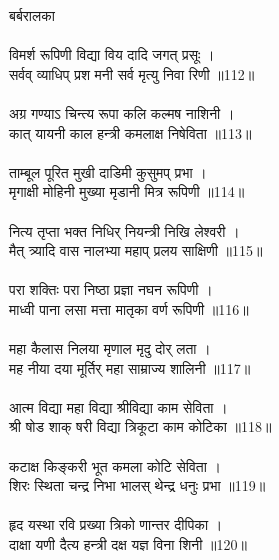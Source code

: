 {\small{} बर्बरालका}\\
\\
विमर्श रूपिणी विद्या विय दादि जगत् प्रसूः ।\\
सर्वव् व्याधिप् प्रश मनी सर्व मृत्यु निवा रिणी ॥112॥\\
\\
अग्र गण्याऽ चिन्त्य रूपा कलि कल्मष नाशिनी ।\\
कात् यायनी काल हन्त्री कमलाक्ष निषेविता ॥113॥\\
\\
ताम्बूल पूरित मुखी दाडिमी कुसुमप् प्रभा ।\\
मृगाक्षी मोहिनी मुख्या मृडानी मित्र रूपिणी ॥114॥\\
\\
नित्य तृप्ता भक्त निधिर् नियन्त्री निखि लेश्वरी ।\\
मैत् त्र्यादि वास नालभ्या महाप् प्रलय साक्षिणी ॥115॥\\
\\
परा शक्तिः परा निष्ठा प्रज्ञा नघन रूपिणी ।\\
माध्वी पाना लसा मत्ता मातृका वर्ण रूपिणी ॥116॥\\
\\
महा कैलास निलया मृणाल मृदु दोर् लता ।\\
मह नीया दया मूर्तिर् महा साम्राज्य शालिनी ॥117॥\\
\\
आत्म विद्या महा विद्या श्रीविद्या काम सेविता ।\\
श्री षोड शाक् षरी विद्या त्रिकूटा काम कोटिका ॥118॥\\
\\
कटाक्ष किङ्करी भूत कमला कोटि सेविता ।\\
शिरः स्थिता चन्द्र निभा भालस् थेन्द्र धनुः प्रभा ॥119॥\\
\\
हृद यस्था रवि प्रख्या त्रिको णान्तर दीपिका ।\\
दाक्षा यणी दैत्य हन्त्री दक्ष यज्ञ विना शिनी ॥120॥\\
